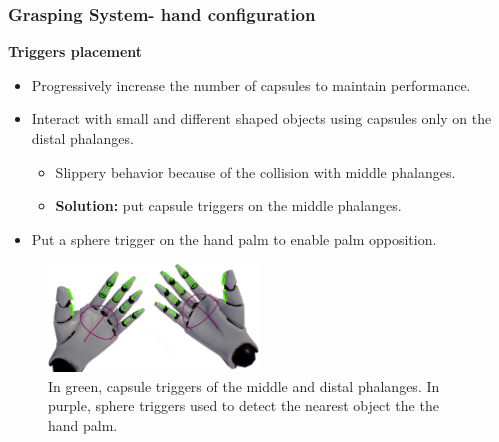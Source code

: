 \documentclass{beamer}
\theoremstyle{remark}
\theoremstyle{plain}
\begin{document}
\begin{frame}
\frametitle{Grasping System- hand configuration}

\textbf{Triggers placement}

\begin{itemize}
	\item Progressively increase the number of capsules to maintain performance.
	\item Interact with small and different shaped objects using capsules only on the distal phalanges.
	\begin{itemize}
		\item Slippery behavior because of the collision with middle phalanges.
		\item \textbf{Solution:} put capsule triggers on the middle phalanges.
	\end{itemize}
	\item Put a sphere trigger on the hand palm to enable palm opposition.
\end{itemize}

\begin{figure}
	\centering
	\includegraphics[width=0.5\textwidth]{images/mannequin_hands}
	\caption{In green, capsule triggers of the middle and distal phalanges. In purple, sphere triggers used to detect the nearest object the the hand palm.}
\end{figure}
\end{frame}
\end{document}
